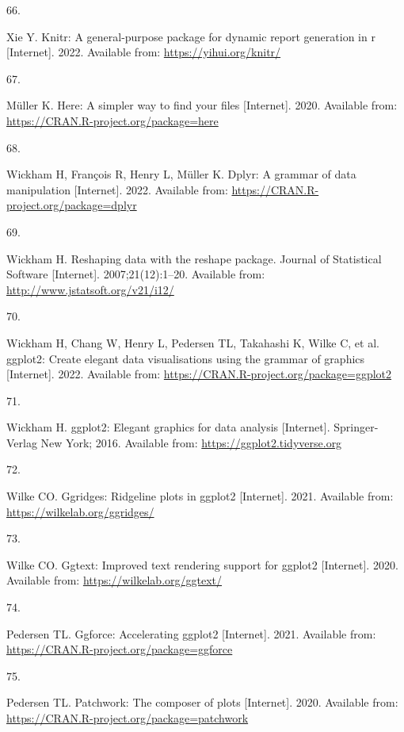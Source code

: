 \documentclass[10pt,a4paper]{article}
\newlength{\cslhangindent}
\newlength{\csllabelwidth}
\newlength{\cslentryspacingunit} %
\newenvironment{CSLReferences}[2] %
 {%
  \setlength{\parindent}{0pt}
  \ifodd #1
  \let\oldpar\par
  \def\par{\hangindent=\cslhangindent\oldpar}
  \fi
  \setlength{\parskip}{#2\cslentryspacingunit}
 }%
 {}
\newcommand{\CSLLeftMargin}[1]{\parbox[t]{\csllabelwidth}{#1}}
\newcommand{\CSLRightInline}[1]{\parbox[t]{\linewidth - \csllabelwidth}{#1}\break}
\begin{document}
\begin{CSLReferences}{0}{0}
\leavevmode\hypertarget{ref-R-knitr}{}%
\CSLLeftMargin{66. }
\CSLRightInline{Xie Y. Knitr: A general-purpose package for dynamic report generation in r {[}Internet{]}. 2022. Available from: \url{https://yihui.org/knitr/}}

\leavevmode\hypertarget{ref-R-here}{}%
\CSLLeftMargin{67. }
\CSLRightInline{Müller K. Here: A simpler way to find your files {[}Internet{]}. 2020. Available from: \url{https://CRAN.R-project.org/package=here}}

\leavevmode\hypertarget{ref-R-dplyr}{}%
\CSLLeftMargin{68. }
\CSLRightInline{Wickham H, François R, Henry L, Müller K. Dplyr: A grammar of data manipulation {[}Internet{]}. 2022. Available from: \url{https://CRAN.R-project.org/package=dplyr}}

\leavevmode\hypertarget{ref-reshape22007}{}%
\CSLLeftMargin{69. }
\CSLRightInline{Wickham H. Reshaping data with the {reshape} package. Journal of Statistical Software {[}Internet{]}. 2007;21(12):1--20. Available from: \url{http://www.jstatsoft.org/v21/i12/}}

\leavevmode\hypertarget{ref-R-ggplot2}{}%
\CSLLeftMargin{70. }
\CSLRightInline{Wickham H, Chang W, Henry L, Pedersen TL, Takahashi K, Wilke C, et al. ggplot2: Create elegant data visualisations using the grammar of graphics {[}Internet{]}. 2022. Available from: \url{https://CRAN.R-project.org/package=ggplot2}}

\leavevmode\hypertarget{ref-ggplot22016}{}%
\CSLLeftMargin{71. }
\CSLRightInline{Wickham H. ggplot2: Elegant graphics for data analysis {[}Internet{]}. Springer-Verlag New York; 2016. Available from: \url{https://ggplot2.tidyverse.org}}

\leavevmode\hypertarget{ref-R-ggridges}{}%
\CSLLeftMargin{72. }
\CSLRightInline{Wilke CO. Ggridges: Ridgeline plots in ggplot2 {[}Internet{]}. 2021. Available from: \url{https://wilkelab.org/ggridges/}}

\leavevmode\hypertarget{ref-R-ggtext}{}%
\CSLLeftMargin{73. }
\CSLRightInline{Wilke CO. Ggtext: Improved text rendering support for ggplot2 {[}Internet{]}. 2020. Available from: \url{https://wilkelab.org/ggtext/}}

\leavevmode\hypertarget{ref-R-ggforce}{}%
\CSLLeftMargin{74. }
\CSLRightInline{Pedersen TL. Ggforce: Accelerating ggplot2 {[}Internet{]}. 2021. Available from: \url{https://CRAN.R-project.org/package=ggforce}}

\leavevmode\hypertarget{ref-R-patchwork}{}%
\CSLLeftMargin{75. }
\CSLRightInline{Pedersen TL. Patchwork: The composer of plots {[}Internet{]}. 2020. Available from: \url{https://CRAN.R-project.org/package=patchwork}}


\end{CSLReferences}
\end{document}
